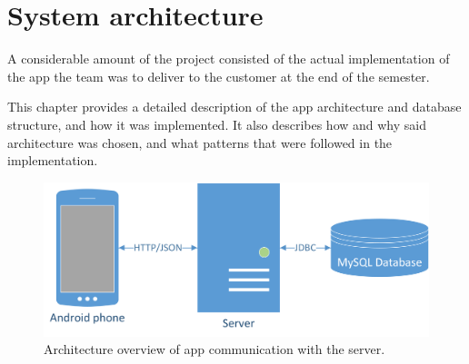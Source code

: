 \chapter{System architecture}

A considerable amount of the project consisted of the actual implementation of the app the team was to deliver to the customer at the end of the semester. 

This chapter provides a detailed description of the app architecture and database structure, and how it was implemented. It also describes how and why said architecture was chosen, and what patterns that were followed in the implementation.

\begin{figure}[H]
\includegraphics[width=\textwidth]{ch/architecture/fig/arch.png}
\caption{Architecture overview of app communication with the server.}
\label{fig:architecture}
\end{figure}





